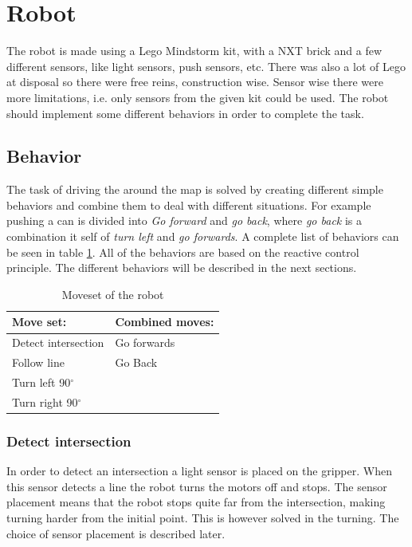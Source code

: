 \section{Robot} 

The robot is made using a Lego Mindstorm kit, with a NXT brick and a few different sensors, like light sensors, push sensors, etc. There was also a lot of Lego at disposal so there were free reins, construction wise. Sensor wise there were more limitations, i.e. only sensors from the given kit could be used. The robot should implement some different behaviors in order to complete the task.

\subsection{Behavior} \label{sec:behavior}
The task of driving the around the map is solved by creating different simple behaviors and combine them to deal with different situations. For example pushing a can is divided into \textit{Go forward} and \textit{go back}, where \textit{go back} is a combination it self of \textit{turn left} and \textit{go forwards}. A complete list of behaviors can be seen in table \ref{tab:movset}. All of the behaviors are based on the reactive control principle. The different behaviors will be described in the next sections.

\begin{table}[H]
\centering
 \begin{tabular}{|l|l|}
  \hline
  Move set: &  Combined moves: \\
  \hline
   Detect intersection & Go forwards\\
   Follow line & Go Back\\
   Turn left 90$^{\circ}$  &\\
   Turn right 90$^{\circ}$ & \\
   \hline
 \end{tabular}
\caption{Moveset of the robot}
\label{tab:movset}
\end{table}

\subsubsection{Detect intersection}
In order to detect an intersection a light sensor is placed on the gripper. When this sensor detects a line the robot turns the motors off and stops. 
The sensor placement means that the robot stops quite far from the intersection, making turning harder from the initial point.
This is however solved in the turning.
The choice of sensor placement is described later.

